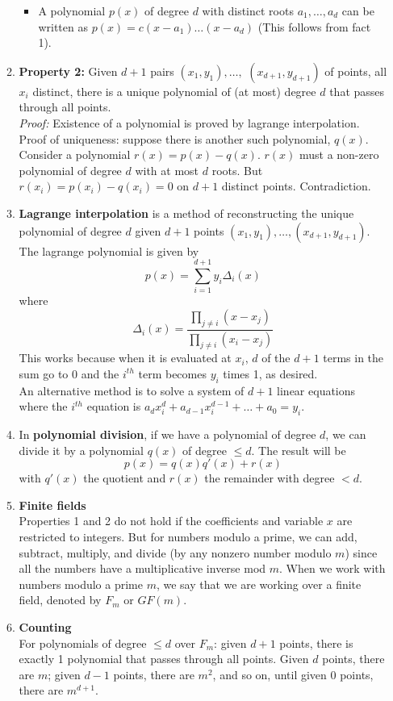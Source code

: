 \documentclass[10pt]{article}
\begin{document}
\begin{multicols}{2}
\begin{enumerate}
\begin{enumerate}
\begin{itemize}
        \item A polynomial $p(x)$ of degree $d$ with distinct roots $a_1,\hdots,a_d$ can be written as $p(x)=c(x-a_1) \ldots (x-a_d)$ (This follows from fact 1).
    \end{itemize}
    \item \textbf{Property 2:} Given $d+1$ pairs $(x_1,y_1),\hdots,$ $(x_{d+1}, y_{d+1})$ of points, all $x_i$ distinct, there is a unique polynomial of (at most) degree $d$ that passes through all points. \\
    \textit{Proof:} Existence of a polynomial is proved by lagrange interpolation. Proof of uniqueness: suppose there is another such polynomial, $q(x)$. Consider a polynomial $r(x)=p(x)-q(x)$. $r(x)$ must a non-zero polynomial of degree $d$ with at most $d$ roots. But $r(x_i)=p(x_i)-q(x_i)=0$ on $d+1$ distinct points. Contradiction.
    \item \textbf{Lagrange interpolation} is a method of reconstructing the unique polynomial of degree $d$ given $d+1$ points $(x_1,y_1), \hdots,(x_{d+1}, y_{d+1})$. The lagrange polynomial is given by 
    $$p(x)=\sum_{i=1}^{d+1} y_i \Delta_i(x)$$ where
    $$\Delta_i(x)=\frac{\prod_{j \neq i} (x-x_j)}{\prod_{j \neq i} (x_i-x_j)}$$ 
    This works because when it is evaluated at $x_i$, $d$ of the $d+1$ terms in the sum go to 0 and the $i^{th}$ term becomes $y_i$ times 1, as desired. \\[8 pt]
    An alternative method is to solve a system of $d+1$ linear equations where the $i^{th}$ equation is $a_dx_{i}^{d}+a_{d-1}x_i^{d-1}+\hdots+a_0=y_i$.
    \item In \textbf{polynomial division}, if we have a polynomial of degree $d$, we can divide it by a polynomial $q(x)$ of degree $\leq d$. The result will be $$p(x)=q(x)q'(x)+r(x)$$ with $q'(x)$ the quotient and $r(x)$ the remainder with degree $< d$.
    
    \item \textbf{Finite fields} \\
    Properties 1 and 2 do not hold if the coefficients and variable $x$ are restricted to integers. But for numbers modulo a prime, we can add, subtract, multiply, and divide (by any nonzero number modulo $m$) since all the numbers have a multiplicative inverse mod $m$. When we work with numbers modulo a prime $m$, we say that we are working over a finite field, denoted by $F_m$ or $GF(m)$.
    
    \item \textbf{Counting} \\
    For polynomials of degree $\leq d$ over $F_m$: given $d+1$ points, there is exactly 1 polynomial that passes through all points. Given $d$ points, there are $m$; given $d-1$ points, there are $m^{2}$, and so on, until given 0 points, there are $m^{d+1}$.
    

\end{enumerate}
\end{enumerate}
\end{multicols}
\end{document}

